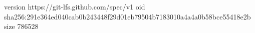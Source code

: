 version https://git-lfs.github.com/spec/v1
oid sha256:291e364ed040cab0b243448f29d01eb79504b7183010a4a4a0b58bce55418e2b
size 786528
